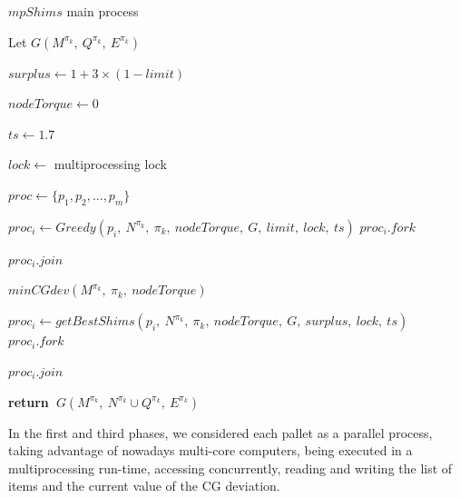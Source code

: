 \documentclass[preprint,authoryear]{elsarticle}
\renewcommand{\Return}{\State \bf {return}~}
\begin{document}
\begin{algorithm}[H]
	\caption{$mpShims$ main process}  \label{alg:mpShims}
	
	\begin{algorithmic}[1]
		
		
		\State Let $G(M^{\pi_k},\ Q^{\pi_k},\ E^{\pi_k})$ \label{mpShims:g1} 
		
		\State $surplus \gets 1 + 3 \times (1 - limit)$
		
		\State $nodeTorque \gets 0$
		
		\State $ts \gets 1.7$  \label{mpShims:ts}
		
		\State $lock \gets$ multiprocessing lock  \label{mpShims:lock} 
		
		\State $proc \gets \{p_1,p_2,..., p_m\}$  
		
		\State $proc_i \gets Greedy(p_i,\ N^{\pi_k},\ \pi_k,\ nodeTorque,\ G,\ limit,\ lock,\ ts )$   \label{mpShims:greedy}
		\State $proc_i.fork$
		\EndFor
		
		\State $proc_i.join$ \label{mpShims:join1}
		\EndFor
		
		\State $minCGdev(M^{\pi_k},\ \pi_k,\ nodeTorque)$  \label{mpShims:minCGdev} 
		
		\State $proc_i \gets getBestShims(p_i,\ N^{\pi_k},\ \pi_k,\ nodeTorque,\ G,\ surplus,\ lock,\ ts )$ \label{mpShims:getBestShims}
		\State $proc_i.fork$
		\EndFor
		
		\State $proc_i.join$ \label{mpShims:join2}

		\EndFor
		
		\Return $G(M^{\pi_k},\ N^{\pi_k} \cup Q^{\pi_k},\ E^{\pi_k})$ \label{mpShims:return}
		
		\EndProcedure
		
	\end{algorithmic}
\end{algorithm}

In the first and third phases, we considered each pallet as a parallel process, taking advantage of nowadays multi-core computers, being executed in a multiprocessing run-time, accessing concurrently, reading and writing the list of items and the current value of the CG deviation.
\end{document}

